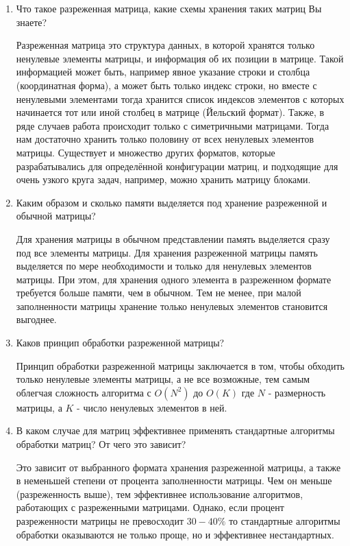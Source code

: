 \begin{enumerate}
	\item Что такое разреженная матрица, какие схемы хранения таких матриц Вы знаете?
	
	Разреженная матрица это структура данных, в которой хранятся только ненулевые элементы матрицы, и информация об их позиции в матрице. Такой информацией может быть, например явное указание строки и столбца (координатная форма), а может быть только индекс строки, но вместе с ненулевыми  элементами  тогда  хранится  список  индексов  элементов  с которых начинается тот или иной столбец в матрице (Йельский формат). Также,  в  ряде  случаев  работа  происходит  только  с  симетричными матрицами.  Тогда  нам  достаточно  хранить  только  половину  от  всех ненулевых элементов матрицы. Существует и множество других форматов, которые разрабатывались для определённой конфигурации матриц, и подходящие для очень узкого круга задач, например, можно хранить матрицу блоками.
	
	\item Каким  образом  и  сколько  памяти  выделяется  под  хранение разреженной и обычной матрицы? 
	
	Для хранения матрицы в обычном представлении память выделяется сразу под все элементы матрицы. Для  хранения  разреженной  матрицы  память  выделяется  по  мере необходимости и только для ненулевых элементов матрицы. При  этом,  для  хранения одного  элемента  в  разреженном  формате требуется  больше  памяти,  чем  в  обычном.  Тем  не  менее,  при  малой заполненности матрицы хранение только ненулевых элементов становится выгоднее.
	
	\item Каков принцип обработки разреженной матрицы?
	
	Принцип обработки разреженной матрицы заключается в том, чтобы обходить только ненулевые элементы матрицы, а не все возможные, тем самым облегчая сложность алгоритма с $O(N^2)$  до $O(K)$  где $N$  -  размерность матрицы, а $K$ - число ненулевых элементов в ней.
	
	\item В  каком  случае  для  матриц  эффективнее  применять стандартные алгоритмы обработки матриц? От чего это зависит? 
	
	Это зависит от выбранного формата хранения разреженной матрицы, а также в неменьшей степени от процента заполненности матрицы. Чем он меньше (разреженность выше), тем эффективнее использование алгоритмов, работающих с разреженными матрицами. Однако, если процент разреженности матрицы не превосходит $30-40\%$ то стандартные  алгоритмы  обработки  оказываются  не  только  проще,  но  и эффективнее нестандартных. 
\end{enumerate}



















